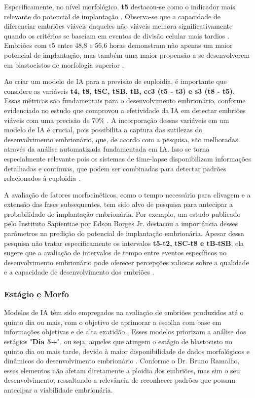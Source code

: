 Especificamente, no nível morfológico, \textbf{t5} destacou-se como o indicador mais relevante do potencial de implantação \cite{cruz2012}. Observa-se que a capacidade de diferenciar embriões viáveis daqueles não viáveis melhora significativamente quando os critérios se baseiam em eventos de divisão celular mais tardios \cite{cruz2012}. Embriões com t5 entre 48,8 e 56,6 horas demonstram não apenas um maior potencial de implantação, mas também uma maior propensão a se desenvolverem em blastocistos de morfologia superior \cite{cruz2012}.

Ao criar um modelo de IA para a previsão de euploidia, é importante que considere as variáveis \textbf{t4, t8, tSC, tSB, tB, cc3 (t5 - t3) e s3 (t8 - t5)}. Essas métricas são fundamentais para o desenvolvimento embrionário, conforme evidenciado no estudo que comprovou a efetividade da IA em detectar embriões viáveis com uma precisão de 70\% \cite{borges2019}. A incorporação dessas variáveis em um modelo de IA é crucial, pois possibilita a captura das sutilezas do desenvolvimento embrionário, que, de acordo com a pesquisa, são melhoradas através da análise automatizada fundamentada em IA. Isso se torna especialmente relevante pois os sistemas de time-lapse disponibilizam informações detalhadas e contínuas, que podem ser combinadas para detectar padrões relacionados à euploidia \cite{borges2019}.

A avaliação de fatores morfocinéticos, como o tempo necessário para clivagem e a extensão das fases subsequentes, tem sido alvo de pesquisa para antecipar a probabilidade de implantação embrionária. Por exemplo, um estudo publicado pelo Instituto Sapientiae por Edson Borges Jr. destacou a importância desses parâmetros na predição do potencial de implantação embrionária. Apesar dessa pesquisa não tratar especificamente os intervalos \textbf{t5-t2, tSC-t8 e tB-tSB}, ela sugere que a avaliação de intervalos de tempo entre eventos específicos no desenvolvimento embrionário pode oferecer percepções valiosas sobre a qualidade e a capacidade de desenvolvimento dos embriões \cite{borges2022}.

\subsubsection{Estágio e Morfo}
Modelos de IA têm sido empregados na avaliação de embriões produzidos até o quinto dia ou mais, com o objetivo de aprimorar a escolha com base em informações objetivas e de alta exatidão \cite{lassen2022}. Esses modelos priorizam a análise dos estágios "\textbf{Dia 5+}", ou seja, aqueles que atingem o estágio de blastocisto no quinto dia ou mais tarde, devido à maior disponibilidade de dados morfológicos e dinâmicos do desenvolvimento embrionário \cite{lassen2022}. Conforme o Dr. Bruno Ramalho, esses elementos não afetam diretamente a ploidia dos embriões, mas sim o seu desenvolvimento, ressaltando a relevância de reconhecer padrões que possam antecipar a viabilidade embrionária.

